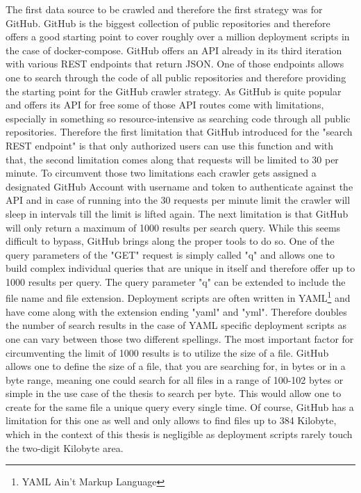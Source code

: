 The first data source to be crawled and therefore the first strategy was for GitHub. GitHub is the biggest collection of public repositories and therefore offers a good starting point to cover roughly over a million deployment scripts in the case of docker-compose.
GitHub offers an API already in its third iteration with various REST endpoints that return JSON. One of those endpoints allows one to search through the code of all public repositories and therefore providing the starting point for the GitHub crawler strategy. As GitHub is quite popular and offers its API for free some of those API routes come with limitations, especially in something so resource-intensive as searching code through all public repositories.
Therefore the first limitation that GitHub introduced for the "search REST endpoint" is that only authorized users can use this function and with that, the second limitation comes along that requests will be limited to 30 per minute. To circumvent those two limitations each crawler gets assigned a designated GitHub Account with username and token to authenticate against the API and in case of running into the 30 requests per minute limit the crawler will sleep in intervals till the limit is lifted again.
The next limitation is that GitHub will only return a maximum of 1000 results per search query. While this seems difficult to bypass, GitHub brings along the proper tools to do so. One of the query parameters of the "GET" request is simply called "q" and allows one to build complex individual queries that are unique in itself and therefore offer up to 1000 results per query. The query parameter "q" can be extended to include the file name and file extension. Deployment scripts are often written in YAML\footnote{YAML Ain't Markup Language} and have come along with the extension ending "yaml" and "yml". Therefore doubles the number of search results in the case of YAML specific deployment scripts as one can vary between those two different spellings. The most important factor for circumventing the limit of 1000 results is to utilize the size of a file. GitHub allows one to define the size of a file, that you are searching for, in bytes or in a byte range, meaning one could search for all files in a range of 100-102 bytes or simple in the use case of the thesis to search per byte. This would allow one to create for the same file a unique query every single time.
Of course, GitHub has a limitation for this one as well and only allows to find files up to 384 Kilobyte, which in the context of this thesis is negligible as deployment scripts rarely touch the two-digit Kilobyte area.


